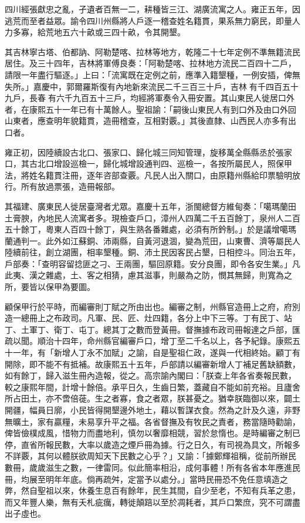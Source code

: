 \begin{pinyinscope}
四川經張獻忠之亂，孑遺者百無一二，耕種皆三江、湖廣流寓之人。雍正五年，因逃荒而至者益眾。諭令四川州縣將人戶逐一稽查姓名籍貫，果系無力窮民，即量人力多寡，給荒地五六十畝或三四十畝，令其開墾。

其吉林寧古塔、伯都訥、阿勒楚喀、拉林等地方，乾隆二十七年定例不準無籍流民居住。及三十四年，吉林將軍傅良奏：「阿勒楚喀、拉林地方流民二百四十二戶，請限一年盡行驅逐。」上曰：「流寓既在定例之前，應準入籍墾種，一例安插，俾無失所。」嘉慶中，郭爾羅斯復有內地新來流民二千三百三十戶，吉林有千四百五十九戶，長春有六千九百五十三戶，均經將軍奏令入冊安置。其山東民人徙居口外者，在康熙五十一年已有十萬餘人。聖祖諭：「嗣後山東民人有到口外及由口外回山東者，應查明年貌籍貫，造冊稽查，互相對覈。」其後直隸、山西民人亦多有出口者。

雍正初，因陸續設古北口、張家口、歸化城三同知管理，旋移萬全縣縣丞於張家口，其古北口增設巡檢一，歸化城增設通判四、巡檢一，各按所屬民人，照保甲法，將姓名籍貫注冊，逐年咨部查覈。凡民人出入關口，由原籍州縣給印票驗明放行。所有放過票張，造冊報部。

其福建、廣東民人徙居臺灣者尤眾。嘉慶十五年，浙閩總督方維甸奏：「噶瑪蘭田土膏腴，內地民人流寓者多。現檢查戶口，漳州人四萬二千五百餘丁，泉州人二百五十餘丁，粵東人百四十餘丁，與生熟各番雜處，必須有所鈐制。」於是議增噶瑪蘭通判一。此外如江蘇銅、沛兩縣，自黃河退涸，變為荒田，山東曹、濟等屬民人陸續前往，創立湖團，相率墾種。銅、沛土民因客民占墾，日相控斗。同治五年，戶部奏：「查明容留捻匪之刁、王兩團，驅回原籍。安分良團，即令各安生業。」凡此夷、漢之雜處，土、客之相猜，慮其滋事，則嚴為之防，憫其無歸，則寬為之所，要皆以保甲為要圖。

顧保甲行於平時，而編審則丁賦之所由出也。編審之制，州縣官造冊上之府，府別造一總冊上之布政司。凡軍、民、匠、灶四籍，各分上中下三等。丁有民丁、站丁、土軍丁、衛丁、屯丁。總其丁之數而登黃冊。督撫據布政司冊報達之戶部，匯疏以聞。順治十四年，命州縣官編審戶口，增丁至二千名以上，各予紀錄。康熙五十一年，有「新增人丁永不加賦」之諭，自是聖祖仁政，遂與一代相終始。顧丁有開除，即不能不有抵補。故康熙五十五年，戶部請以編審新增人丁補足舊缺額數，如有餘丁，歸入滋生冊內造報，從之。高宗諭內閣曰：「朕查上年各省奏報民數，較之康熙年間，計增十餘倍。承平日久，生齒日繁，蓋藏自不能如前充裕。且廬舍所占田土，亦不啻倍蓰。生之者寡，食之者眾，朕甚憂之。猶幸朕臨御以來，闢土開疆，幅員日廓，小民皆得開墾邊外地土，藉以暫謀衣食。然為之計及久遠，非野無曠土，家有贏糧，未易享升平之福。各省督撫及有牧民之責者，務當隨時勸諭，俾皆儉樸成風，惜物力而盡地利，慎勿以奢靡相競，習於怠惰也。是時編審之制已停，直省所報民數，大率以歲造之煙戶冊為據。行之日久，有司視為具文，所報多不詳覈，其何以體朕欲周知天下民數之心乎？」又諭：「據鄭輝祖稱，從前所辦民數冊，歲歲滋生之數，一律雷同。似此簡率相沿，成何事體！所有各省本年應進民冊，均展至明年年底。倘再疏舛，定當予以處分。」當時民冊恐不免任意填造之弊，然自聖祖以來，休養生息百有餘年，民生其間，自少至老，不知有兵革之患，而又年豐人樂，無有夭札疵癘，轉徙顛踣以至於凋耗者，其戶口繁庶，究不可謂盡出子虛也。


\end{pinyinscope}
